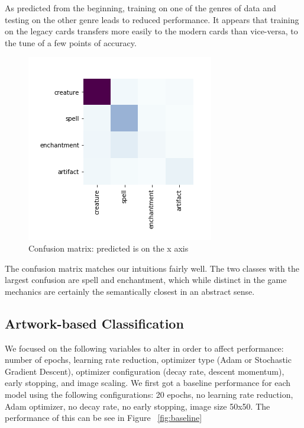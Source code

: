 \documentclass[letterpaper]{article} %
\begin{document}
As predicted from the beginning,
training on one of the genres of data
and testing on the other genre leads to reduced performance.
It appears that training on the legacy cards
transfers more easily to the modern cards
than vice-versa,
to the tune of a few points of accuracy.

\begin{figure}
  \includegraphics[width=.45\textwidth]{text-confusion-matrix}
  \caption{Confusion matrix: predicted is on the x axis}
\end{figure}

The confusion matrix matches our intuitions fairly well.
The two classes with the largest confusion are spell and enchantment,
which while distinct in the game mechanics
are certainly the semantically closest in an abstract sense.

\subsection{Artwork-based Classification}

We focused on the following variables to alter in order to affect performance:
number of epochs, learning rate reduction, optimizer type
(Adam or Stochastic Gradient Descent), optimizer configuration (decay rate,
descent momentum), early stopping, and image scaling.
We first got a baseline performance for each model using the following
configurations: 20 epochs, no learning rate reduction, Adam optimizer,
no decay rate, no early stopping, image size 50x50.
The performance of this can
be see in Figure ~\ref{fig:baseline}
\end{document}
